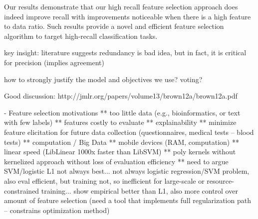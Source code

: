 Our results demonstrate that our high recall feature selection
approach does indeed improve recall with improvements noticeable when
there is a high feature to data ratio.  Such results provide a novel
and efficient feature selection algorithm to target high-recall
classification tasks.

\COMMENT











key insight: literature suggests redundancy is bad idea, but in fact, it is critical for precision (implies agreement)

how to strongly justify the model and objectives we use?  voting?

Good discussion: http://jmlr.org/papers/volume13/brown12a/brown12a.pdf

- Feature selection motivations
** too little data (e.g., bioinformatics, or text with few labels)
** features costly to evaluate
** explainability
** minimize feature elicitation for future data collection (questionnaires, medical tests -- blood tests)
** computation / Big Data
** mobile devices (RAM, computation)
** linear speed (LibLinear 1000x faster than LibSVM)
** poly kernels without kernelized approach without loss of evaluation efficiency
** need to argue SVM/logistic L1 not always best... not always logistic regression/SVM problem, also eval efficient, but training not, so 
inefficient for large-scale or resource-constrained training... show empirical better than L1, also more control over amount of feature 
selection (need a tool that implements full regularization path -- constrains optimization method)


